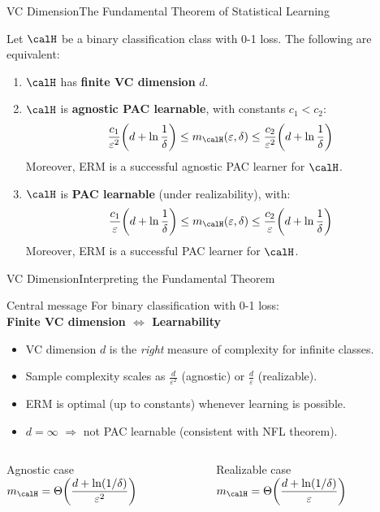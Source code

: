 \begin{frame}{VC Dimension}{The Fundamental Theorem of Statistical Learning}
  \begin{mytheorem}
    Let $\calH$ be a binary classification class with 0-1 loss. The following are
    equivalent:
    \begin{enumerate}
      \item $\calH$ has \textbf{finite VC dimension} $d$.
      \item $\calH$ is \textbf{agnostic PAC learnable}, with constants $c_1<c_2$:
        \[
          \frac{c_1}{\varepsilon^2}\!\left(d+\ln\frac{1}{\delta}\right)
          \leq m_\calH(\varepsilon,\delta)
          \leq \frac{c_2}{\varepsilon^2}\!\left(d+\ln\frac{1}{\delta}\right)
        \]
        Moreover, ERM is a successful agnostic PAC learner for $\calH$.
      \item $\calH$ is \textbf{PAC learnable} (under realizability), with:
        \[
          \frac{c_1}{\varepsilon}\!\left(d+\ln\frac{1}{\delta}\right)
          \leq m_\calH(\varepsilon,\delta)
          \leq \frac{c_2}{\varepsilon}\!\left(d+\ln\frac{1}{\delta}\right)
        \]
        Moreover, ERM is a successful PAC learner for $\calH$.
    \end{enumerate}
  \end{mytheorem}
\end{frame}

\begin{frame}{VC Dimension}{Interpreting the Fundamental Theorem}
  \begin{block}{Central message}
    For binary classification with 0-1 loss:\\[4pt]
    \textbf{Finite VC dimension $\Leftrightarrow$ Learnability}
  \end{block}
  \bigskip
  \begin{itemize}
    \item VC dimension $d$ is the \emph{right} measure of complexity for infinite classes.
    \item Sample complexity scales as $\frac{d}{\varepsilon^2}$ (agnostic) or
          $\frac{d}{\varepsilon}$ (realizable).
    \item ERM is optimal (up to constants) whenever learning is possible.
    \item $d=\infty$ $\Rightarrow$ not PAC learnable (consistent with NFL theorem).
  \end{itemize}
  \bigskip
  \begin{columns}[T]
    \begin{block}{Agnostic case}
      $m_\calH = \Theta\!\left(\dfrac{d+\ln(1/\delta)}{\varepsilon^2}\right)$
    \end{block}
    \begin{block}{Realizable case}
      $m_\calH = \Theta\!\left(\dfrac{d+\ln(1/\delta)}{\varepsilon}\right)$
    \end{block}
  \end{columns}
\end{frame}


